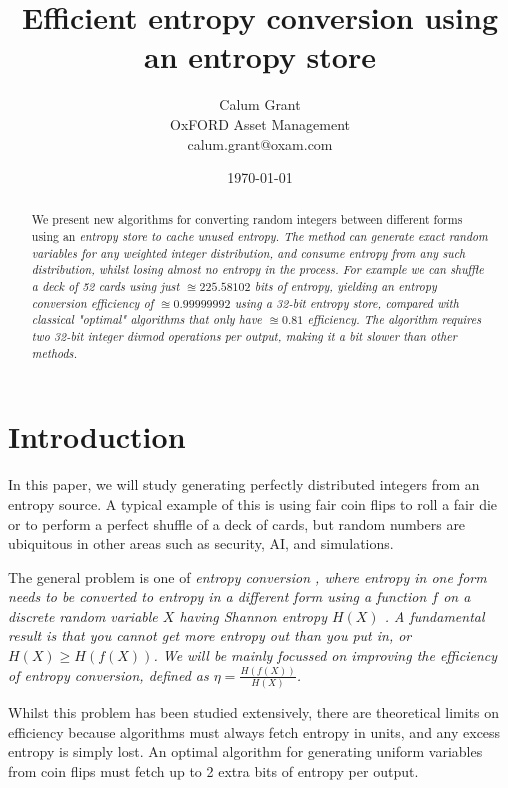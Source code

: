 \documentclass[12pt]{article}
\title{Efficient entropy conversion using an entropy store}
\author{Calum Grant \\
OxFORD Asset Management \\
calum.grant@oxam.com}
\date{\today}
\begin{document}
\maketitle

\begin{abstract}
    We present new algorithms for converting random integers between different forms using an \em entropy store \em to cache unused entropy. The method can generate exact random variables for any weighted integer distribution, and consume entropy from any such distribution, whilst losing almost no entropy in the process.  For example we can shuffle a deck of 52 cards using just $\approxeq 225.58102$ bits of entropy, yielding an entropy conversion efficiency of $\approxeq 0.99999992$ using a 32-bit entropy store, compared with classical "optimal" algorithms that only have $\approxeq 0.81$ efficiency.  The algorithm requires two 32-bit integer divmod operations per output, making it a bit slower than other methods.
\end{abstract}

\section{Introduction}

In this paper, we will study generating perfectly distributed integers from an entropy source. A typical example of this is using fair coin flips to roll a fair die or to perform a perfect shuffle of a deck of cards, but random numbers are ubiquitous in other areas such as security, AI, and simulations.

The general problem is one of \em entropy conversion \em, where entropy in one form needs to be converted to entropy in a different form using a function $f$ on a discrete random variable $X$ having Shannon entropy $H(X)$
\cite{shannon1948mathematical}.  
A fundamental result is that you cannot get more entropy out than you put in, or $H(X) \ge H(f(X))$. \cite{cover1999elements} 
We will be mainly focussed on improving the \em efficiency \em of entropy conversion, defined as $\eta = \frac{H(f(X))}{H(X)}$.

Whilst this problem has been studied extensively, there are theoretical limits on efficiency because algorithms must always fetch entropy in units, and any excess entropy is simply lost. An optimal algorithm for generating uniform variables from coin flips must fetch up to 2 extra bits of entropy per output.  \cite{cover1999elements, Knuth1976TheCO}
\end{document}
